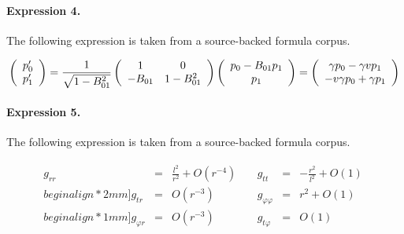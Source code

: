 \documentclass[11pt]{article}
\begin{document}
\paragraph{Expression 4.} The following expression is taken from a source-backed formula corpus.

\begin{align*}\left(\begin{array}{c}p'_{0} \\ p'_{1}\end{array}\right)={1\over\sqrt{1-B_{01}^{2}}} \left(\begin{array}{cc}1 & 0 \\-B_{01} & 1-B_{01}^{2}\end{array}\right) \left(\begin{array}{c}p_{0}-B_{01}p_{1} \\p_{1}\end{array}\right) =\left(\begin{array}{c}\gamma p_{0}-\gamma vp_{1} \\-v\gamma p_{0}+\gamma p_{1}\end{array}\right)\end{align*}

\paragraph{Expression 5.} The following expression is taken from a source-backed formula corpus.

\begin{align*}\begin{array}{lllllll}g_{rr} & = & \displaystyle \frac{l^{2}}{r^{2}}+O(r^{-4})\; & & g_{tt} & = & \displaystyle-\frac{r^{2} }{l^{2}}+O(1)\;\\begin{align*}2mm] g_{tr} & = & O(r^{-3})\; & & g_{\varphi \varphi } & = & r^{2}+O(1)\; \\begin{align*}1mm] g_{\varphi r} & = &O(r^{-3})\; & & g_{t\varphi } & = & O(1)\;\end{array}\end{align*}
\end{document}
